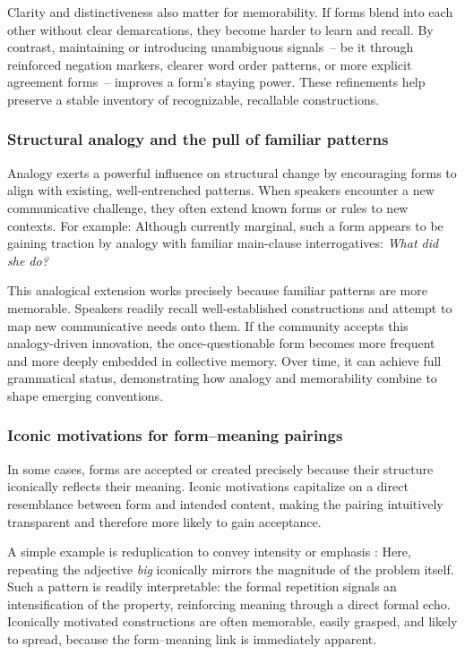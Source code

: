 Clarity and distinctiveness also matter for memorability. If forms blend into each other without clear demarcations, they become harder to learn and recall. By contrast, maintaining or introducing unambiguous signals~-- be it through reinforced negation markers, clearer word order patterns, or more explicit agreement forms~-- improves a form’s staying power. These refinements help preserve a stable inventory of recognizable, recallable constructions.

\subsubsection{Structural analogy and the pull of familiar patterns}

Analogy exerts a powerful influence on structural change by encouraging forms to align with existing, well-entrenched patterns. When speakers encounter a new communicative challenge, they often extend known forms or rules to new contexts. For example:
\z
Although currently marginal, such a form appears to be gaining traction by analogy with familiar main-clause interrogatives:
\ea
\textit{What did she do?}
\z

This analogical extension works precisely because familiar patterns are more memorable. Speakers readily recall well-established constructions and attempt to map new communicative needs onto them. If the community accepts this analogy-driven innovation, the once-questionable form becomes more frequent and more deeply embedded in collective memory. Over time, it can achieve full grammatical status, demonstrating how analogy and memorability combine to shape emerging conventions.

\subsubsection{Iconic motivations for form--meaning pairings}\label{subsec:iconic-motivations}

In some cases, forms are accepted or created precisely because their structure iconically reflects their meaning. Iconic motivations capitalize on a direct resemblance between form and intended content, making the pairing intuitively transparent and therefore more likely to gain acceptance.

A simple example is reduplication to convey intensity or emphasis \autocite{Moravcsik1978}:
\label{ex:big-big}
\z
Here, repeating the adjective \textit{big} iconically mirrors the magnitude of the problem itself. Such a pattern is readily interpretable: the formal repetition signals an intensification of the property, reinforcing meaning through a direct formal echo. Iconically motivated constructions are often memorable, easily grasped, and likely to spread, because the form--meaning link is immediately apparent.

